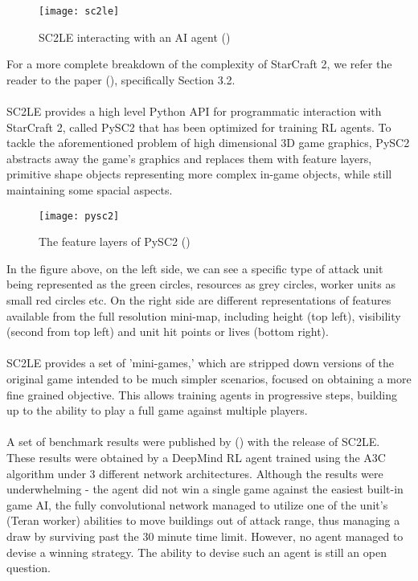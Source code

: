 \begin{figure}[H]
    \centering
    \texttt{[image: sc2le]}
    \caption{SC2LE interacting with an AI agent (\citet{starcraft})}
\end{figure}

For a more complete breakdown of the complexity of StarCraft 2, we refer the reader to the paper (\citet{starcraft}), specifically Section 3.2. \paragraph{}

SC2LE provides a high level Python API for programmatic interaction with StarCraft 2, called PySC2 that has been optimized for training RL agents. To tackle the aforementioned problem of high dimensional 3D game graphics, PySC2 abstracts away the game's graphics and replaces them with feature layers, primitive shape objects representing more complex in-game objects, while still maintaining some spacial aspects.

\begin{figure}[H]
    \centering
    \texttt{[image: pysc2]}
    \caption{The feature layers of PySC2 (\citet{starcraft})}
\end{figure}

In the figure above, on the left side, we can see a specific type of attack unit being represented as the green circles, resources as grey circles, worker units as small red circles etc. On the right side are different representations of features available from the full resolution mini-map, including height (top left), visibility (second from top left) and unit hit points or lives (bottom right). \paragraph{}

SC2LE provides a set of 'mini-games,' which are stripped down versions of the original game intended to be much simpler scenarios, focused on obtaining a more fine grained objective. This allows training agents in progressive steps, building up to the ability to play a full game against multiple players. \paragraph{}

A set of benchmark results were published by (\citet{starcraft}) with the release of SC2LE. These results were obtained by a DeepMind RL agent trained using the A3C algorithm under 3 different network architectures. Although the results were underwhelming - the agent did not win a single game against the easiest built-in game AI, the fully convolutional network managed to utilize one of the unit's (Teran worker) abilities to move buildings out of attack range, thus managing a draw by surviving past the 30 minute time limit. However, no agent managed to devise a winning strategy. The ability to devise such an agent is still an open question.

